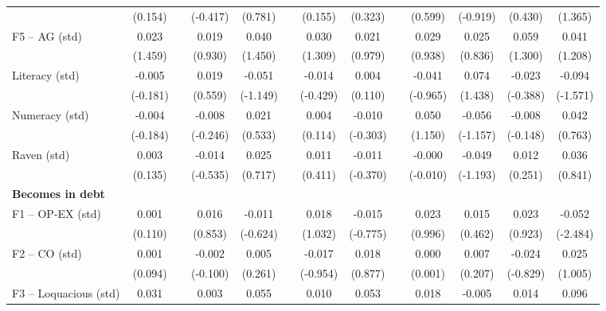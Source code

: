 \begin{table}[htbp]
{\begin{tabular}{lcccccccccccc}
          & (0.154) &       & (-0.417) & (0.781) &       & (0.155) & (0.323) &       & (0.599) & (-0.919) & (0.430) & (1.365) \\
    F5 -- AG (std) & 0.023 &       & 0.019 & 0.040 &       & 0.030 & 0.021 &       & 0.029 & 0.025 & 0.059 & 0.041 \\
          & (1.459) &       & (0.930) & (1.450) &       & (1.309) & (0.979) &       & (0.938) & (0.836) & (1.300) & (1.208) \\
    Literacy (std) & -0.005 &       & 0.019 & -0.051 &       & -0.014 & 0.004 &       & -0.041 & 0.074 & -0.023 & -0.094 \\
          & (-0.181) &       & (0.559) & (-1.149) &       & (-0.429) & (0.110) &       & (-0.965) & (1.438) & (-0.388) & (-1.571) \\
    Numeracy (std) & -0.004 &       & -0.008 & 0.021 &       & 0.004 & -0.010 &       & 0.050 & -0.056 & -0.008 & 0.042 \\
          & (-0.184) &       & (-0.246) & (0.533) &       & (0.114) & (-0.303) &       & (1.150) & (-1.157) & (-0.148) & (0.763) \\
    Raven (std) & 0.003 &       & -0.014 & 0.025 &       & 0.011 & -0.011 &       & -0.000 & -0.049 & 0.012 & 0.036 \\
          & (0.135) &       & (-0.535) & (0.717) &       & (0.411) & (-0.370) &       & (-0.010) & (-1.193) & (0.251) & (0.841) \\
    \midrule
    \textbf{Becomes in debt} &       &       &       &       &       &       &       &       &       &       &       &  \\
    F1 -- OP-EX (std) & 0.001 &       & 0.016 & -0.011 &       & 0.018 & -0.015 &       & 0.023 & 0.015 & 0.023 & \cellcolor[rgb]{ 1,  1,  0}-0.052 \\
          & (0.110) &       & (0.853) & (-0.624) &       & (1.032) & (-0.775) &       & (0.996) & (0.462) & (0.923) & (-2.484) \\
    F2 -- CO (std) & 0.001 &       & -0.002 & 0.005 &       & -0.017 & 0.018 &       & 0.000 & 0.007 & -0.024 & 0.025 \\
          & (0.094) &       & (-0.100) & (0.261) &       & (-0.954) & (0.877) &       & (0.001) & (0.207) & (-0.829) & (1.005) \\
    F3 -- Loquacious (std) & \cellcolor[rgb]{ 1,  1,  0}0.031 &       & 0.003 & \cellcolor[rgb]{ 1,  1,  0}0.055 &       & 0.010 & \cellcolor[rgb]{ 1,  1,  0}0.053 &       & 0.018 & -0.005 & 0.014 & \cellcolor[rgb]{ 1,  1,  0}0.096 \\

\end{tabular}}
\end{table}
